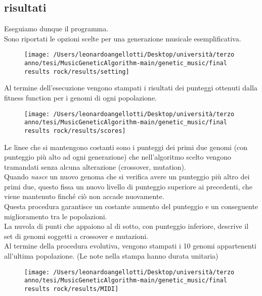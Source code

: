\documentclass[a4paper,12pt]{report}
\begin{document}
\subsection{risultati}

Eseguiamo dunque il programma. \\
Sono riportati le opzioni scelte per una generazione musicale esemplificativa.

\begin{figure}[H]
    \centering
    \texttt{[image: /Users/leonardoangellotti/Desktop/università/terzo anno/tesi/MusicGeneticAlgorithm-main/genetic\_music/final results rock/results/setting]} 
    \label{fig:immagine9}
\end{figure}

Al termine dell'esecuzione vengono stampati i risultati dei punteggi ottenuti dalla fitness function per i genomi di ogni popolazione.

\begin{figure}[H]
    \centering
    \texttt{[image: /Users/leonardoangellotti/Desktop/università/terzo anno/tesi/MusicGeneticAlgorithm-main/genetic\_music/final results rock/results/scores]} 
    \label{fig:immagine10}
\end{figure}

Le linee che si mantengono costanti sono i punteggi dei primi due genomi (con punteggio più alto ad ogni generazione) che nell'algoritmo scelto vengono tramandati senza alcuna alterazione (crossover, mutation). \\
Quando \textit{nasce} un nuovo genoma che si verifica avere un punteggio più altro dei primi due, questo fissa un nuovo livello di punteggio superiore ai precedenti, che viene mantenuto finché ciò non accade nuovamente. \\
Questa procedura garantisce un costante aumento del punteggio e un conseguente miglioramento tra le popolazioni. \\
La nuvola di punti che appaiono al di sotto, con punteggio inferiore, descrive il set di genomi soggetti a crossover e mutazioni. \\
Al termine della procedura evolutiva, vengono stampati i 10 genomi appartenenti all'ultima popolazione. (Le note nella stampa hanno durata unitaria)

\begin{figure}[H]
    \centering
    \texttt{[image: /Users/leonardoangellotti/Desktop/università/terzo anno/tesi/MusicGeneticAlgorithm-main/genetic\_music/final results rock/results/MIDI]} 
    \label{fig:immagine11}
\end{figure}
\end{document}
